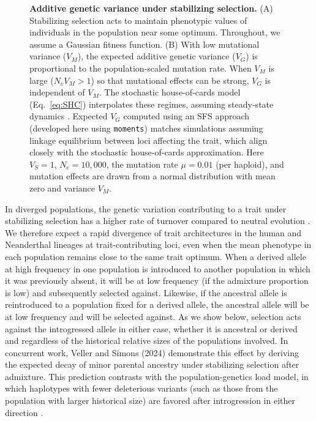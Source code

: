 \documentclass[10pt,letterpaper]{article}
\newcommand{\moments}{\texttt{moments}\xspace}
\begin{document}
\begin{figure}[tb!]
    \centering
    \caption{
        \textbf{Additive genetic variance under stabilizing selection.}
        (A) Stabilizing selection acts to maintain phenotypic values of
        individuals in the population near some optimum. Throughout, we assume
        a Gaussian fitness function.
        (B) With low mutational variance ($V_M$), the expected additive
        genetic variance ($V_G$) is proportional to the
        population-scaled mutation rate. When $V_M$ is large ($N_e V_M > 1$) so that
        mutational effects can be strong, $V_G$ is independent of $V_M$.
        The stochastic house-of-cards model (Eq.~\ref{eq:SHC})
        interpolates these regimes, assuming steady-state dynamics
        \cite{burger1989much}. Expected $V_G$ computed using an SFS approach
        (developed here using \moments \cite{jouganous2017inferring})
        matches simulations assuming linkage equilibrium between loci affecting the
        trait, which align closely with the stochastic house-of-cards
        approximation.
        Here $V_S=1$, $N_e=10{,}000$, the mutation rate
        $\mu=0.01$ (per haploid), and mutation effects are drawn from a normal
        distribution with mean zero and variance $V_M$.
    }
    \label{fig:stab-sel}
\end{figure}

In diverged populations, the genetic variation contributing to a trait under
stabilizing selection has a higher rate of turnover compared to neutral
evolution \cite{yair2022population}. We therefore expect a rapid divergence of
trait architectures in the human and Neanderthal lineages at trait-contributing
loci, even when the mean phenotype in each population remains close to the same
trait optimum. When a derived allele at high frequency in one population is
introduced to another population in which it was previously absent, it will be
at low frequency (if the admixture proportion is low) and subsequently selected
against. Likewise, if the ancestral allele is reintroduced to a population
fixed for a derived allele, the ancestral allele will be at low frequency and
will be selected against. As we show below, selection acts against the
introgressed allele in either case, whether it is ancestral or derived and
regardless of the historical relative sizes of the populations involved. In
concurrent work, Veller and Simons (2024) \cite{veller2024stabilizing}
demonstrate this effect by deriving the expected decay of minor parental
ancestry under stabilizing selection after admixture. This prediction
contrasts with the population-genetics load model, in which haplotypes with
fewer deleterious variants (such as those from the population with larger
historical size) are favored after introgression in either direction
\cite{castellano2014patterns,petr2019limits,petr2020evolutionary}.
\end{document}
